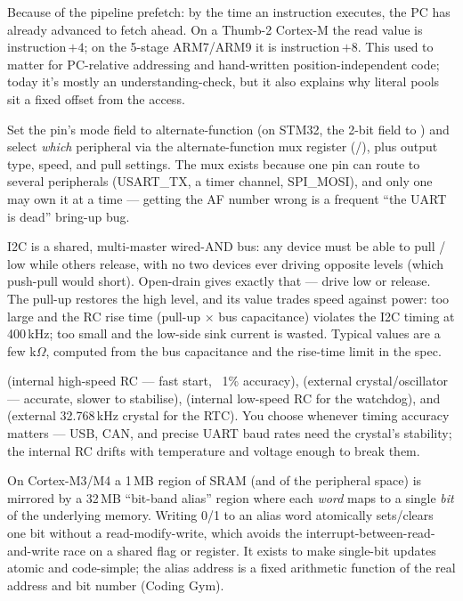 Because of the pipeline prefetch: by the time an instruction executes, the PC
has already advanced to fetch ahead. On a Thumb-2 Cortex-M the read value is
instruction\,$+4$; on the 5-stage ARM7/ARM9 it is instruction\,$+8$. This used
to matter for PC-relative addressing and hand-written position-independent
code; today it's mostly an understanding-check, but it also explains why
literal pools sit a fixed offset from the access.

Set the pin's mode field to alternate-function (on STM32, the 2-bit
 field to ) and select \emph{which} peripheral via the
alternate-function mux register (/), plus output type,
speed, and pull settings. The mux exists because one pin can route to several
peripherals (USART\_TX, a timer channel, SPI\_MOSI), and only one may own it
at a time --- getting the AF number wrong is a frequent ``the UART is dead''
bring-up bug.

I2C is a shared, multi-master wired-AND bus: any device must be able to pull
/ low while others release, with no two devices ever
driving opposite levels (which push-pull would short). Open-drain gives exactly
that --- drive low or release. The pull-up restores the high level, and its
value trades speed against power: too large and the RC rise time (pull-up
$\times$ bus capacitance) violates the I2C timing at 400\,kHz; too small and
the low-side sink current is wasted. Typical values are a few k$\Omega$,
computed from the bus capacitance and the rise-time limit in the spec.

 (internal high-speed RC --- fast start, ~1\% accuracy),
 (external crystal/oscillator --- accurate, slower to stabilise),
 (internal low-speed RC for the watchdog), and  (external
32.768\,kHz crystal for the RTC). You choose  whenever timing
accuracy matters --- USB, CAN, and precise UART baud rates need the crystal's
stability; the internal RC drifts with temperature and voltage enough to break
them.

On Cortex-M3/M4 a 1\,MB region of SRAM (and of the peripheral space) is mirrored
by a 32\,MB ``bit-band alias'' region where each \emph{word} maps to a single
\emph{bit} of the underlying memory. Writing 0/1 to an alias word atomically
sets/clears one bit without a read-modify-write, which avoids the
interrupt-between-read-and-write race on a shared flag or register. It exists
to make single-bit updates atomic and code-simple; the alias address is a
fixed arithmetic function of the real address and bit number (Coding Gym).

